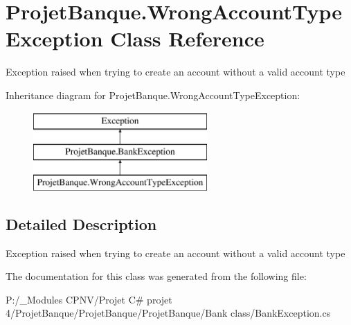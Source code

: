 \hypertarget{class_projet_banque_1_1_wrong_account_type_exception}{}\section{Projet\+Banque.\+Wrong\+Account\+Type\+Exception Class Reference}
\label{class_projet_banque_1_1_wrong_account_type_exception}


Exception raised when trying to create an account without a valid account type  


Inheritance diagram for Projet\+Banque.\+Wrong\+Account\+Type\+Exception\+:\begin{figure}[H]
\begin{center}
\leavevmode
\includegraphics[height=3.000000cm]{class_projet_banque_1_1_wrong_account_type_exception}
\end{center}
\end{figure}


\subsection{Detailed Description}
Exception raised when trying to create an account without a valid account type 



The documentation for this class was generated from the following file\+:\begin{DoxyCompactItemize}
\item 
P\+:/\+\_\+\+Modules C\+P\+N\+V/\+Projet C\# projet 4/\+Projet\+Banque/\+Projet\+Banque/\+Projet\+Banque/\+Bank class/Bank\+Exception.\+cs\end{DoxyCompactItemize}
